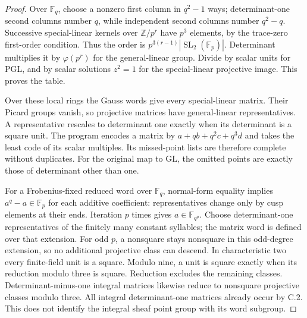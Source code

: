 \begin{proof}
Over $\mathbb F_q$, choose a nonzero first column in $q^2-1$
ways; determinant-one second columns number $q$, while
independent second columns number $q^2-q$.
Successive special-linear kernels over $\mathbb Z/p^r$
have $p^3$ elements, by the trace-zero first-order condition.
Thus the order is $p^{3(r-1)}|\operatorname{SL}_2(\mathbb F_p)|$.
Determinant multiplies it by $\varphi(p^r)$ for the
general-linear group. Divide by scalar units for PGL,
and by scalar solutions $z^2=1$ for the special-linear
projective image. This proves the table.

Over these local rings the Gauss words give every
special-linear matrix. Their Picard groups vanish, so
projective matrices have general-linear representatives.
A representative rescales to determinant one exactly
when its determinant is a square unit.
The program encodes a matrix by $a+qb+q^2c+q^3d$ and
takes the least code of its scalar multiples.
Its missed-point lists are therefore complete without
duplicates. For the original map to GL, the omitted
points are exactly those of determinant other than one.

For a Frobenius-fixed reduced word over $\mathbb F_q$,
normal-form equality implies $a^q-a\in\mathbb F_p$
for each additive coefficient: representatives change
only by cusp elements at their ends.
Iteration $p$ times gives $a\in\mathbb F_{q^p}$.
Choose determinant-one representatives of the finitely
many constant syllables; the matrix word is defined over
that extension. For odd $p$, a nonsquare stays nonsquare
in this odd-degree extension, so no additional projective
class can descend. In characteristic two every finite-field
unit is a square.
Modulo nine, a unit is square exactly when its reduction
modulo three is square. Reduction excludes the remaining
classes. Determinant-minus-one integral matrices likewise
reduce to nonsquare projective classes modulo three.
All integral determinant-one matrices already occur by C.2.
This does not identify the integral sheaf point group
with its word subgroup.
\end{proof}

